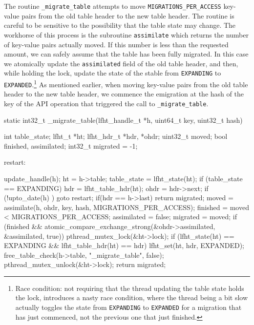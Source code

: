 The routine \texttt{\_migrate\_table} attempts to move \texttt{MIGRATIONS\_PER\_ACCESS} key-value
pairs from the old table header to the new table header. The routine is careful to be sensitive to
the possibility that the table state may change.
The workhorse of this process
is the subroutine  \texttt{assimilate} which returns the number of key-value pairs actually moved.
If this number is less than the requested amount, we can safely assume that the table has been
fully migrated. In this case we atomically update the \texttt{assimilated} field of the old table header,
and then, while holding the lock, update the state of the stable from \texttt{EXPANDING} to
\texttt{EXPANDED}.\footnote{Race condition: not requiring that the thread updating the
  table state holds the lock, introduces a nasty race condition, where the thread being a bit slow
  actually toggles the state from \texttt{EXPANDING} to \texttt{EXPANDED} for a migration that
  has just commenced, not the previous one that just finished.}
As mentioned earlier, when moving key-value pairs from the old table header to the new table header, we
commence the emigration at the hash of the key of the API operation that triggered the call to \texttt{\_migrate\_table}.




\begin{center}
\begin{clisting}
static int32_t _migrate_table(lfht_handle_t *h, uint64_t key, uint32_t hash){
  int table_state;
  lfht_t *ht;
  lfht_hdr_t *hdr, *ohdr;
  uint32_t moved;
  bool finished, assimilated;
  int32_t migrated = -1;
  
 restart:

  update_handle(h);
  ht = h->table;
  table_state = lfht_state(ht);
  if (table_state == EXPANDING){
    hdr = lfht_table_hdr(ht);
    ohdr = hdr->next;
    if (!upto_date(h) ){ goto restart; }
    if(hdr == h->last){ return migrated; }
    moved = assimilate(h, ohdr, key, hash,  MIGRATIONS_PER_ACCESS);
    finished = moved < MIGRATIONS_PER_ACCESS;
    assimilated = false;
    migrated = moved;
    if (finished  &&  atomic_compare_exchange_strong(&ohdr->assimilated, &assimilated, true)){
      pthread_mutex_lock(&ht->lock);
      if (lfht_state(ht) == EXPANDING  && lfht_table_hdr(ht) == hdr){
	lfht_set(ht, hdr, EXPANDED);
        free_table_check(h->table, "_migrate_table", false);
      }
      pthread_mutex_unlock(&ht->lock);
    }
  }
  return migrated;
}
\end{clisting}
\end{center}


